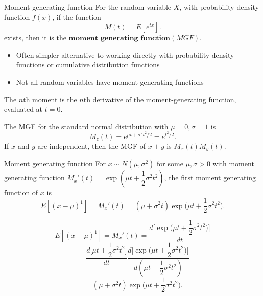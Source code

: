 \documentclass[11pt,table]{beamer}
\begin{document}
\begin{frame}{Moment generating function}
For the random variable $X$, with probability density function $f(x)$, if the function
\begin{equation*}
    M(t) = E[e^{tx}].
\end{equation*}
exists, then it is the $\textbf{moment generating function}(MGF)$.

\begin{itemize}
	\item Often simpler alternative to working directly with probability density functions or cumulative distribution functions
	\item Not all random variables have moment-generating functions
\end{itemize}
The $n$th moment is the $n$th derivative of the moment-generating function, evaluated at $t=0$. 

\begin{example}
The MGF for the standard normal distribution with $\mu=0, \sigma=1$ is $$M_{z}(t) = e^{\mu t+ \sigma^2t^{2}/2} = e^{t^{2}/2}.$$
If $x$ and $y$ are independent, then the MGF of $x + y$ is $M_{x}(t)M_{y}(t).$
\end{example}
\end{frame}


\begin{frame}{Moment generating function}
\small
For $x \sim N (\mu, \sigma^2)$ for some $\mu,\sigma>0$ with moment generating function ${M_x}'(t) =  \exp (\mu t + \dfrac 1 2 \sigma^2 t^2)$, the first moment generating function of $x$ is
$$ E[(x - \mu)^{1}]={M_x}'(t)= (\mu +  \sigma^2 t)\exp \bigg(\mu t + \dfrac 1 2 \sigma^2 t^2\bigg).$$
\small
\begin{example}
$$ E[(x - \mu)^{1}]={M_x}'(t) = \frac{d\bigg[\exp \bigg(\mu t + \dfrac 1 2 \sigma^2 t^2\bigg)\bigg]}{dt}$$ 
$$= \frac{d\bigg[\mu t + \dfrac 1 2 \sigma^2 t^2\bigg]}{dt}\frac{d\bigg[\exp \bigg(\mu t + \dfrac 1 2 \sigma^2 t^2\bigg)\bigg]}{d(\mu t + \dfrac 1 2 \sigma^2 t^2)}$$
$$ =(\mu +  \sigma^2 t)\exp \bigg(\mu t + \dfrac 1 2 \sigma^2 t^2\bigg).$$
\end{example}
\end{frame}
\end{document}
